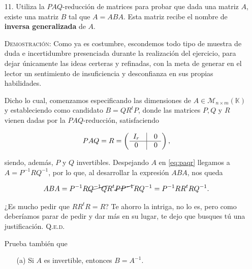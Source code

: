 \documentclass{article}
\begin{document}
\begin{enumerate}
    \item[11.] Utiliza la $PAQ$-reducción de matrices para probar que dada una matriz $A$, existe una matriz $B$ tal que $A = ABA$. Esta matriz recibe el nombre de \textbf{inversa generalizada} de $A$.

    \vspace{7px}
    
    \textsc{Demostración}: Como ya es costumbre, escondemos todo tipo de muestra de duda e incertidumbre presenciada durante la realización del ejercicio, para dejar únicamente las ideas certeras y refinadas, con la meta de generar en el lector un sentimiento de insuficiencia y desconfianza en sus propias habilidades.

    Dicho lo cual, comenzamos especificando las dimensiones de $A \in \mathcal{M}_{n \times m}(\mathbb{K})$ y estableciendo como candidato $B = QR^tP$, donde las matrices $P, Q$ y $R$ vienen dadas por la $PAQ$-reducción, satisfaciendo

    \begin{equation}
        PAQ = R = 
        \left(
        \hspace{6px}
        \begin{matrix}
            I_r & \vline & 0 \\
            \hline
            0 & \vline & 0
        \end{matrix}
        \hspace{6px}
        \right),
        \label{eq:paqr}     
    \end{equation}

    siendo, además, $P$ y $Q$ invertibles. Despejando $A$ en \eqref{eq:paqr} llegamos a $A = P^{-1}RQ^{-1}$, por lo que, al desarrollar la expresión $ABA$, nos queda

    \[ABA = P^{-1}R\cancel{Q^{-1}Q}R^t\cancel{PP^{-1}}RQ^{-1} = P^{-1}RR^tRQ^{-1}.\]

    ¿Es mucho pedir que $RR^tR = R$? Te ahorro la intriga, no lo es, pero como deberíamos parar de pedir y dar más en su lugar, te dejo que busques tú una justificación. \hfill{\textsc{Q.e.d.}}

    \vspace{7px}

    Prueba también que

    \begin{enumerate}
        \item[(a)] Si $A$ es invertible, entonces $B = A^{-1}$.


\end{enumerate}
\end{enumerate}
\end{document}
